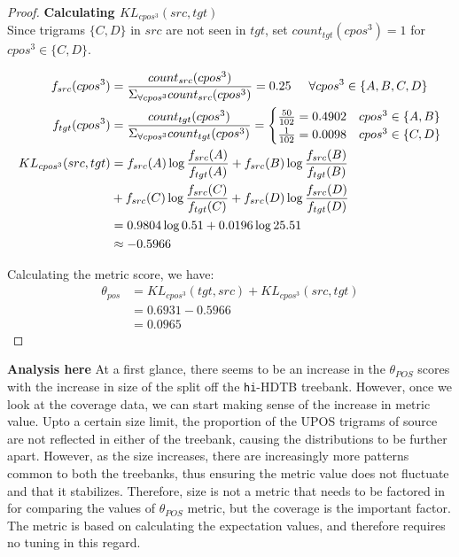 \begin{proof}
\textbf{Calculating \(KL_{cpos^{3}}(src, tgt)\)}\\

Since trigrams \(\{C, D\}\) in \(src\) are not seen in \(tgt\), set \(count_{tgt}(cpos^{3}) = 1\) for \(cpos^{3} \in \{C, D\}\).

\begin{align*}
    f_{src}(cpos^{3}) & = \frac{count_{src}(cpos^{3})}{{\Sigma_{\forall cpos^{3}} count_{src}(cpos^{3})}} = 0.25 \hspace{5mm} \forall cpos^{3} \in \{A, B, C, D\}\\
    f_{tgt}(cpos^{3}) &= \frac{count_{tgt}(cpos^{3})}{{\Sigma_{\forall cpos^{3}} count_{tgt}(cpos^{3})}} =
    \begin{cases}
        \frac{50}{102} = 0.4902 & cpos^{3} \in \{A, B\}\\
        \frac{1}{102} = 0.0098 & cpos^{3} \in \{C, D\}
    \end{cases}\\
    KL_{cpos^{3}}(src, tgt) & = f_{src}(A) \log \frac{f_{src}(A)}{f_{tgt}(A)} + f_{src}(B) \log \frac{f_{src}(B)}{f_{tgt}(B)} \\
    &+ f_{src}(C) \log \frac{f_{src}(C)}{f_{tgt}(C)} + f_{src}(D) \log \frac{f_{src}(D)}{f_{tgt}(D)}\\
    &= 0.9804 \log 0.51 + 0.0196 \log 25.51 \\
    &\approx -0.5966
\end{align*}

Calculating the metric score, we have:
\begin{align*}
    \theta_{pos} & = KL_{cpos^{3}}(tgt, src) + KL_{cpos^{3}}(src, tgt) \\
    &= 0.6931 - 0.5966 \\
    &= 0.0965
\end{align*}


\end{proof}

\textbf{Analysis here}
At a first glance, there seems to be an increase in the \(\theta_{POS}\) scores with the increase in size of the split off the \verb|hi|-HDTB treebank. However, once we look at the coverage data, we can start making sense of the increase in metric value. Upto a certain size limit, the proportion of the UPOS trigrams of source are not reflected in either of the treebank, causing the distributions to be further apart. However, as the size increases, there are increasingly more patterns common to both the treebanks, thus ensuring the metric value does not fluctuate and that it stabilizes. Therefore, size is not a metric that needs to be factored in for comparing the values of \(\theta_{POS}\) metric, but the coverage is the important factor. The metric is based on calculating the expectation values, and therefore requires no tuning in this regard.


